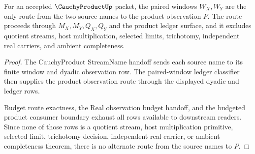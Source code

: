 \begin{theorem}
\label{thm:cauchy-product-window-product-nonescape}
For an accepted $\CauchyProductUp$ packet, the paired windows $W_X,W_Y$ are the only route from the two source names to the product observation $P$. The route proceeds through $M_X,M_Y,Q_X,Q_Y$ and the product ledger surface, and it excludes quotient streams, host multiplication, selected limits, trichotomy, independent real carriers, and ambient completeness.
\end{theorem}
\begin{proof}
The CauchyProduct StreamName handoff sends each source name to its finite window and dyadic observation row. The paired-window ledger classifier then supplies the product observation route through the displayed dyadic and ledger rows.

Budget route exactness, the Real observation budget handoff, and the budgeted product consumer boundary exhaust all rows available to downstream readers. Since none of those rows is a quotient stream, host multiplication primitive, selected limit, trichotomy decision, independent real carrier, or ambient completeness theorem, there is no alternate route from the source names to $P$.
\end{proof}
